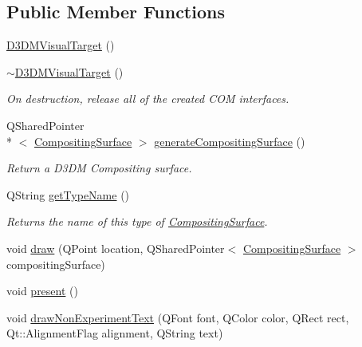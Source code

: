 \subsection*{Public Member Functions}
\begin{DoxyCompactItemize}
\item 
\hyperlink{struct_picto_1_1_d3_d_m_visual_target_a0a934abd4ff1799a508bfe8fb487e824}{D3\-D\-M\-Visual\-Target} ()
\item 
\hypertarget{struct_picto_1_1_d3_d_m_visual_target_a52e680b418f2624819ebd14743e79901}{\hyperlink{struct_picto_1_1_d3_d_m_visual_target_a52e680b418f2624819ebd14743e79901}{$\sim$\-D3\-D\-M\-Visual\-Target} ()}\label{struct_picto_1_1_d3_d_m_visual_target_a52e680b418f2624819ebd14743e79901}

\begin{DoxyCompactList}\small\item\em On destruction, release all of the created C\-O\-M interfaces. \end{DoxyCompactList}\item 
\hypertarget{struct_picto_1_1_d3_d_m_visual_target_abf3cb9d3cbabc10065d74a601a51b46b}{Q\-Shared\-Pointer\\*
$<$ \hyperlink{struct_picto_1_1_compositing_surface}{Compositing\-Surface} $>$ \hyperlink{struct_picto_1_1_d3_d_m_visual_target_abf3cb9d3cbabc10065d74a601a51b46b}{generate\-Compositing\-Surface} ()}\label{struct_picto_1_1_d3_d_m_visual_target_abf3cb9d3cbabc10065d74a601a51b46b}

\begin{DoxyCompactList}\small\item\em Return a D3\-D\-M Compositing surface. \end{DoxyCompactList}\item 
\hypertarget{struct_picto_1_1_d3_d_m_visual_target_ae88604334f06ccae5f06ce09d4fa5f98}{Q\-String \hyperlink{struct_picto_1_1_d3_d_m_visual_target_ae88604334f06ccae5f06ce09d4fa5f98}{get\-Type\-Name} ()}\label{struct_picto_1_1_d3_d_m_visual_target_ae88604334f06ccae5f06ce09d4fa5f98}

\begin{DoxyCompactList}\small\item\em Returns the name of this type of \hyperlink{struct_picto_1_1_compositing_surface}{Compositing\-Surface}. \end{DoxyCompactList}\item 
void \hyperlink{struct_picto_1_1_d3_d_m_visual_target_ac9bf4cffa25642f3ef00c540ea25d8f8}{draw} (Q\-Point location, Q\-Shared\-Pointer$<$ \hyperlink{struct_picto_1_1_compositing_surface}{Compositing\-Surface} $>$ compositing\-Surface)
\item 
void \hyperlink{struct_picto_1_1_d3_d_m_visual_target_a342f15735e17314837c7bddf36ab6e68}{present} ()
\item 
void \hyperlink{struct_picto_1_1_d3_d_m_visual_target_a67c0ba5a787502936c6731f0c11cb22d}{draw\-Non\-Experiment\-Text} (Q\-Font font, Q\-Color color, Q\-Rect rect, Qt\-::\-Alignment\-Flag alignment, Q\-String text)
\end{DoxyCompactItemize}
